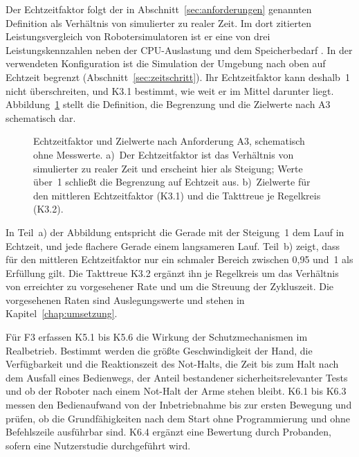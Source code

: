 Der Echtzeitfaktor folgt der in Abschnitt~\ref{sec:anforderungen} genannten Definition als Verhältnis von simulierter zu realer Zeit.
Im dort zitierten Leistungsvergleich von Robotersimulatoren ist er eine von drei Leistungskennzahlen neben der CPU-Auslastung und dem Speicherbedarf \cite{Pitonakova2018}.
In der verwendeten Konfiguration ist die Simulation der Umgebung nach oben auf Echtzeit begrenzt (Abschnitt~\ref{sec:zeitschritt}).
Ihr Echtzeitfaktor kann deshalb~1 nicht überschreiten, und K3.1 bestimmt, wie weit er im Mittel darunter liegt.
Abbildung~\ref{fig:echtzeitfaktor} stellt die Definition, die Begrenzung und die Zielwerte nach A3 schematisch dar.

\begin{figure}[htbp]
  \centering
  
  \caption[Echtzeitfaktor und Zielwerte nach Anforderung A3]{Echtzeitfaktor und Zielwerte nach Anforderung A3, schematisch ohne Messwerte. a)~Der Echtzeitfaktor ist das Verhältnis von simulierter zu realer Zeit \cite{Pitonakova2018} und erscheint hier als Steigung; Werte über~1 schließt die Begrenzung auf Echtzeit aus. b)~Zielwerte für den mittleren Echtzeitfaktor (K3.1) und die Takttreue je Regelkreis (K3.2).}
  \label{fig:echtzeitfaktor}
\end{figure}

In Teil~a) der Abbildung entspricht die Gerade mit der Steigung~1 dem Lauf in Echtzeit, und jede flachere Gerade einem langsameren Lauf.
Teil~b) zeigt, dass für den mittleren Echtzeitfaktor nur ein schmaler Bereich zwischen 0,95 und~1 als Erfüllung gilt.
Die Takttreue K3.2 ergänzt ihn je Regelkreis um das Verhältnis von erreichter zu vorgesehener Rate und um die Streuung der Zykluszeit.
Die vorgesehenen Raten sind Auslegungswerte und stehen in Kapitel~\ref{chap:umsetzung}.

Für F3 erfassen K5.1 bis K5.6 die Wirkung der Schutzmechanismen im Realbetrieb.
Bestimmt werden die größte Geschwindigkeit der Hand, die Verfügbarkeit und die Reaktionszeit des Not-Halts, die Zeit bis zum Halt nach dem Ausfall eines Bedienwegs, der Anteil bestandener sicherheitsrelevanter Tests und ob der Roboter nach einem Not-Halt der Arme stehen bleibt.
K6.1 bis K6.3 messen den Bedienaufwand von der Inbetriebnahme bis zur ersten Bewegung und prüfen, ob die Grundfähigkeiten nach dem Start ohne Programmierung und ohne Befehlszeile ausführbar sind.
K6.4 ergänzt eine Bewertung durch Probanden, sofern eine Nutzerstudie durchgeführt wird.


